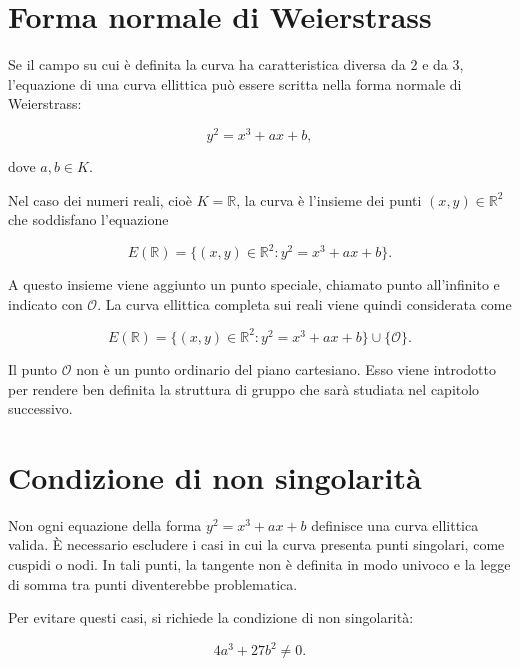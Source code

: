 \documentclass[12pt,a4paper,oneside]{report}
\begin{document}
\section{Forma normale di Weierstrass}

Se il campo su cui è definita la curva ha caratteristica diversa da \(2\) e da \(3\), l'equazione di una curva ellittica può essere scritta nella forma normale di Weierstrass:

\begin{equation}
    y^2 = x^3 + ax + b,
    \label{eq:weierstrass}
\end{equation}

dove \(a,b \in K\).

Nel caso dei numeri reali, cioè \(K=\mathbb{R}\), la curva è l'insieme dei punti \((x,y) \in \mathbb{R}^2\) che soddisfano l'equazione

\begin{equation}
    E(\mathbb{R}) = \{(x,y) \in \mathbb{R}^2 : y^2 = x^3 + ax + b\}.
\end{equation}

A questo insieme viene aggiunto un punto speciale, chiamato punto all'infinito e indicato con \(\mathcal{O}\). La curva ellittica completa sui reali viene quindi considerata come

\begin{equation}
    E(\mathbb{R}) = \{(x,y) \in \mathbb{R}^2 : y^2 = x^3 + ax + b\} \cup \{\mathcal{O}\}.
\end{equation}

Il punto \(\mathcal{O}\) non è un punto ordinario del piano cartesiano. Esso viene introdotto per rendere ben definita la struttura di gruppo che sarà studiata nel capitolo successivo.

\section{Condizione di non singolarità}

Non ogni equazione della forma \(y^2 = x^3 + ax + b\) definisce una curva ellittica valida. È necessario escludere i casi in cui la curva presenta punti singolari, come cuspidi o nodi. In tali punti, la tangente non è definita in modo univoco e la legge di somma tra punti diventerebbe problematica.

Per evitare questi casi, si richiede la condizione di non singolarità:

\begin{equation}
    4a^3 + 27b^2 \neq 0.
    \label{eq:nonsingular}
\end{equation}
\end{document}

